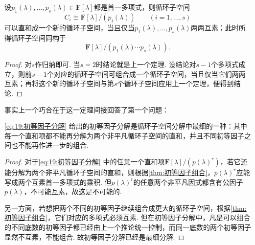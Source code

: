 \begin{corollary}{}{}
    设$p_1(\lambda),\ldots,p_s(\lambda)\in\mathbf{F}[\lambda]$都是首一多项式，则循环子空间
    \[
        C_i\cong \mathbf{F}[\lambda]/(p_i(\lambda))\qquad (i=1,\ldots,s)
    \]
    可以直和成一个新的循环子空间，当且仅当$p_1(\lambda),\ldots,p_s(\lambda)$两两互素；此时所得循环子空间同构于
    \[
        \mathbf{F}[\lambda]/(p_1(\lambda)\cdots p_s(\lambda)).
    \]
\end{corollary}
\begin{proof}
    对$s$作归纳即可. 当$s=2$时结论就是上一个定理. 设结论对$s-1$个多项式成立，则前$s-1$个对应的循环子空间可组合成一个循环子空间，当且仅当它们两两互素；再将这个新的循环子空间与第$s$个循环子空间应用上一个定理，便得到结论.
\end{proof}

事实上一个巧合在于这一定理间接回答了第一个问题：
\begin{corollary}{}{}
    \autoref{eq:19:初等因子分解} 给出的初等因子分解是循环子空间分解中最细的一种：其中每一个直和项都不能再分解为两个非平凡循环子空间的直和，并且不同初等因子之间也不能再作进一步的组合.
\end{corollary}
\begin{proof}
    对于\autoref{eq:19:初等因子分解} 中的任意一个直和项$\mathbf{F}[\lambda]/(p(\lambda)^r)$，若它还能分解为两个非平凡循环子空间的直和，则根据\autoref{thm:初等因子组合}，$p(\lambda)^r$应能写成两个互素首一多项式的乘积. 但$p(\lambda)^r$的任意两个非平凡因式都含有公因子$p(\lambda)$，不可能互素，故这是不可能的.

    另一方面，若想把两个不同的初等因子继续组合成更大的循环子空间，根据\autoref{thm:初等因子组合}，它们对应的多项式必须互素. 但在初等因子分解中，凡是可以组合的不同底数的初等因子都已经由上一个推论统一控制，而同一底数的两个初等因子显然不互素，不能组合. 故初等因子分解已经是最细分解.
\end{proof}

